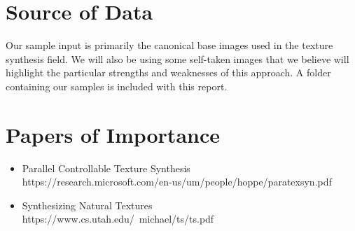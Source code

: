 \documentclass[12pt]{article}
\begin{document}
	\section{Source of Data}
		Our sample input is primarily the canonical base images used in the texture synthesis field.  We will also be using some self-taken images that we believe will highlight the particular strengths and weaknesses of this approach.  A folder containing our samples is included with this report.
		
	\section{Papers of Importance}
	\begin{itemize}
		\item[] Parallel Controllable Texture Synthesis \\
			https://research.microsoft.com/en-us/um/people/hoppe/paratexsyn.pdf
		\item[] Synthesizing Natural Textures \\
			https://www.cs.utah.edu/~michael/ts/ts.pdf
	\end{itemize}
\end{document}
